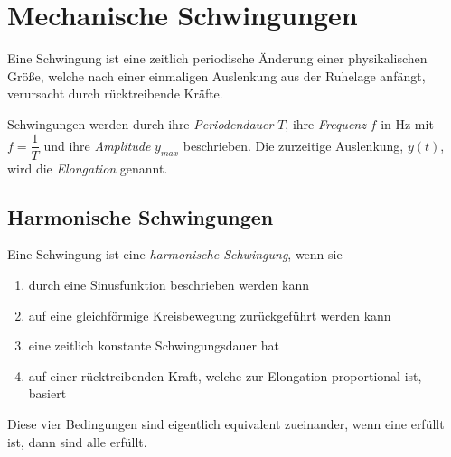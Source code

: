\documentclass{article}
\begin{document}
\section{Mechanische Schwingungen}
Eine Schwingung ist eine zeitlich periodische Änderung einer physikalischen Größe, welche nach einer einmaligen Auslenkung aus der Ruhelage anfängt, verursacht durch rücktreibende Kräfte.
 
Schwingungen werden durch ihre \emph{Periodendauer} $T$, ihre \emph{Frequenz} $f$ in $\text{Hz}$ mit $f=\dfrac{1}{T}$ und ihre \emph{Amplitude} $y_{max}$ beschrieben. Die zurzeitige Auslenkung, $y(t)$, wird die \emph{Elongation} genannt.
\begin{center}
\end{center} 
 
\subsection{Harmonische Schwingungen} 
Eine Schwingung ist eine \emph{harmonische Schwingung}, wenn sie
\begin{enumerate}
 \item durch eine Sinusfunktion beschrieben werden kann
 \item auf eine gleichförmige Kreisbewegung zurückgeführt werden kann
 \item eine zeitlich konstante Schwingungsdauer hat 
 \item auf einer rücktreibenden Kraft, welche zur Elongation proportional ist, basiert 
\end{enumerate} 
Diese vier Bedingungen sind eigentlich equivalent zueinander, wenn eine erfüllt ist, dann sind alle erfüllt.
 
\end{document}
